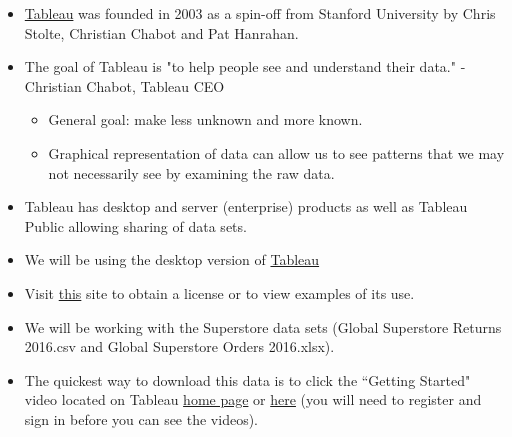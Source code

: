\documentclass[xcolor=svgnames]{beamer} %
\begin{document}
%


\begin{frame}
\begin{itemize}
\item \href{http://www.tableau.com/}{Tableau} was founded in 2003 as a spin-off from Stanford University by Chris Stolte, Christian Chabot and Pat Hanrahan.\vfill

\item The goal of Tableau is "to help people see and understand their data." - Christian Chabot, Tableau CEO\vfill
\begin{itemize}
\item \alert{General goal}: make less unknown and more known.\vfill
\item Graphical representation of data can allow us to see patterns that we may not necessarily see by examining the raw data.\vfill
\end{itemize}


\item Tableau has desktop and server (enterprise) products as well as Tableau Public allowing sharing of data sets.
\vfill
\end{itemize}
\end{frame}



\begin{frame}
\begin{itemize}
\item We will be using the desktop version of \href{https://www.tableau.com/academic/students}{Tableau}
\vfill
\item Visit \href{https://www.tableau.com/academic/students}{this} site to obtain a license or to view examples of its use.
\vfill
\item We will be working with the Superstore data sets (Global Superstore Returns 2016.csv and Global Superstore Orders 2016.xlsx).\vfill
\item The quickest way to download this data is to click the ``Getting Started" video located on Tableau \hyperlink{homepage}{home page} or \href{https://www.tableau.com/learn/tutorials/on-demand/getting-started?product=all&version=tableau\_desktop\_2019\_1\&topic=getting\_started}{here} (you will need to register and sign in before you can see the videos).
\vfill
\end{itemize}
\end{frame}
\end{document}
